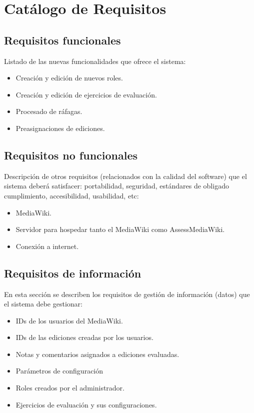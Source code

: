 \section{Catálogo de Requisitos}

\subsection{Requisitos funcionales}
Listado de las nuevas funcionalidades que ofrece el sistema:

\begin{itemize}
	\item Creación y edición de nuevos roles.
	\item Creación y edición de ejercicios de evaluación.
	\item Procesado de ráfagas.
	\item Preasignaciones de ediciones.
\end{itemize}

\subsection{Requisitos no funcionales}
Descripción de otros requisitos (relacionados con la calidad del software) que el sistema deberá satisfacer: portabilidad, seguridad, estándares de obligado cumplimiento, accesibilidad, usabilidad, etc:
\begin{itemize}
	\item MediaWiki.
	\item Servidor para hospedar tanto el MediaWiki como AssessMediaWiki.
	\item Conexión a internet.
\end{itemize}

\subsection{Requisitos de información}
En esta sección se describen los requisitos de gestión de información (datos) que el sistema debe gestionar:
\begin{itemize}
	\item IDs de los usuarios del MediaWiki.
	\item IDs de las ediciones creadas por los usuarios.
	\item Notas y comentarios asignados a ediciones evaluadas.
	\item Parámetros de configuración
	\item Roles creados por el administrador.
	\item Ejercicios de evaluación y sus configuraciones.
\end{itemize}

